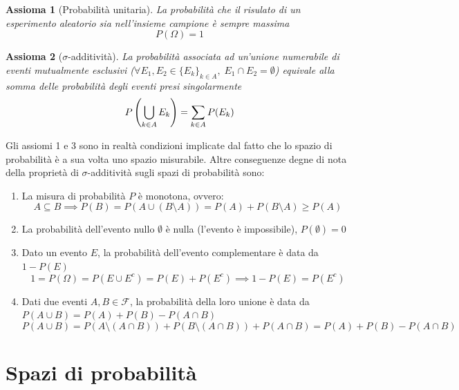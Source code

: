 \documentclass{article}
\newtheorem{axiom}{Assioma}
\begin{document}
            \begin{axiom}[Probabilità unitaria]
                La probabilità che il risulato di un esperimento aleatorio sia nell'insieme campione è sempre massima
                \[
                    P(\Omega) = 1
                \]
            \end{axiom}

            \begin{axiom}[$\sigma$-additività]
                La probabilità associata ad un'unione numerabile di eventi mutualmente esclusivi ($\forall E_{1}, E_{2} \in \{E_{k}\}_{k \in A}, \; E_{1} \cap E_{2} = \emptyset$) equivale alla somma delle probabilità degli eventi presi singolarmente
                \[
                    P\qty(\bigcup_{k \in A} E_{k}) = \sum_{k \in A} P(E_{k})
                \]
            \end{axiom}

            \vspace{10pt} 
            Gli assiomi 1 e 3 sono in realtà condizioni implicate dal fatto che lo spazio di probabilità è a sua volta uno spazio misurabile.
            Altre conseguenze degne di nota della proprietà di $\sigma$-additività sugli spazi di probabilità sono:
            \begin{enumerate}
                \item La misura di probabilità $P$ è monotona, ovvero:
                \[
                    A \subseteq B \implies P(B) = P(A \cup (B \setminus A)) = P(A) + P(B \setminus A) \geq P(A) 
                \]
                \item La probabilità dell'evento nullo $\emptyset$ è nulla (l'evento è impossibile), $P(\emptyset) = 0$
                \item Dato un evento $E$, la probabilità dell'evento complementare è data da $1 - P(E)$
                \[
                    1 = P(\Omega) = P(E \cup E^{c}) = P(E) + P(E^{c}) \implies 1 - P(E) = P(E^{c})
                \]
                \item Dati due eventi $A, B \in \mathcal{F}$, la probabilità della loro unione è data da $P(A \cup B) = P(A) + P(B) - P(A \cap B)$
                \[
                    P(A \cup B) = P(A \setminus (A \cap B)) + P(B \setminus (A \cap B)) + P(A \cap B) = P(A) + P(B) - P(A \cap B)
                \]
            \end{enumerate}



    \newpage
    \section{Spazi di probabilità}
\end{document}
